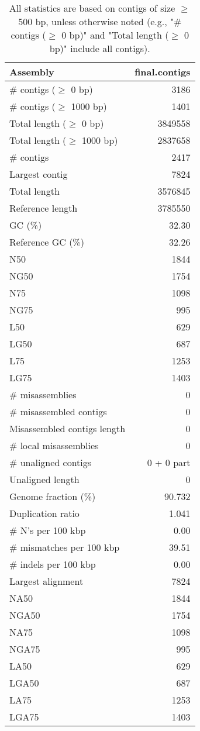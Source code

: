 \documentclass[12pt,a4paper]{article}
\begin{document}
\begin{table}[ht]
\begin{center}
\caption{All statistics are based on contigs of size $\geq$ 500 bp, unless otherwise noted (e.g., "\# contigs ($\geq$ 0 bp)" and "Total length ($\geq$ 0 bp)" include all contigs).}
\begin{tabular}{|l*{1}{|r}|}
\hline
Assembly & final.contigs \\ \hline
\# contigs ($\geq$ 0 bp) & 3186 \\ \hline
\# contigs ($\geq$ 1000 bp) & 1401 \\ \hline
Total length ($\geq$ 0 bp) & 3849558 \\ \hline
Total length ($\geq$ 1000 bp) & 2837658 \\ \hline
\# contigs & 2417 \\ \hline
Largest contig & 7824 \\ \hline
Total length & 3576845 \\ \hline
Reference length & 3785550 \\ \hline
GC (\%) & 32.30 \\ \hline
Reference GC (\%) & 32.26 \\ \hline
N50 & 1844 \\ \hline
NG50 & 1754 \\ \hline
N75 & 1098 \\ \hline
NG75 & 995 \\ \hline
L50 & 629 \\ \hline
LG50 & 687 \\ \hline
L75 & 1253 \\ \hline
LG75 & 1403 \\ \hline
\# misassemblies & 0 \\ \hline
\# misassembled contigs & 0 \\ \hline
Misassembled contigs length & 0 \\ \hline
\# local misassemblies & 0 \\ \hline
\# unaligned contigs & 0 + 0 part \\ \hline
Unaligned length & 0 \\ \hline
Genome fraction (\%) & 90.732 \\ \hline
Duplication ratio & 1.041 \\ \hline
\# N's per 100 kbp & 0.00 \\ \hline
\# mismatches per 100 kbp & 39.51 \\ \hline
\# indels per 100 kbp & 0.00 \\ \hline
Largest alignment & 7824 \\ \hline
NA50 & 1844 \\ \hline
NGA50 & 1754 \\ \hline
NA75 & 1098 \\ \hline
NGA75 & 995 \\ \hline
LA50 & 629 \\ \hline
LGA50 & 687 \\ \hline
LA75 & 1253 \\ \hline
LGA75 & 1403 \\ \hline
\end{tabular}
\end{center}
\end{table}
\end{document}
